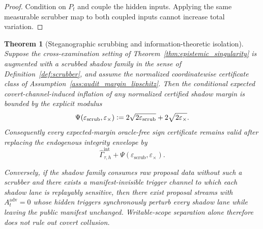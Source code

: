 \documentclass[11pt]{article}
\newtheorem{theorem}{Theorem}[section]
\theoremstyle{definition}
\newcommand{\1}{\mathbf{1}}
\newcommand{\Defeq}{\vcentcolon=}
\begin{document}
\begin{proof}
Condition on $P_t$ and couple the hidden inputs. Applying the same measurable scrubber map to both coupled inputs cannot increase total variation.
\end{proof}

\begin{theorem}[Steganographic scrubbing and information-theoretic isolation]\label{thm:steg_scrub}
Suppose the cross-examination setting of Theorem~\ref{thm:epistemic_singularity} is augmented with a scrubbed shadow family in the sense of Definition~\ref{def:scrubber}, and assume the normalized coordinatewise certificate class of Assumption~\ref{ass:audit_margin_lipschitz}. Then the conditional expected covert-channel-induced inflation of any normalized certified shadow margin is bounded by the explicit modulus
\[
\Psi(\varepsilon_{\mathrm{scrub}},\varepsilon_{\times})
\Defeq
2\sqrt{2\varepsilon_{\mathrm{scrub}}}+2\sqrt{2\varepsilon_{\times}}.
\]
Consequently every expected-margin oracle-free sign certificate remains valid after replacing the endogenous integrity envelope by
\[
\widehat\Gamma_{\tau,h}^{\mathrm{int}} + \Psi(\varepsilon_{\mathrm{scrub}},\varepsilon_{\times}).
\]

Conversely, if the shadow family consumes raw proposal data without such a scrubber and there exists a manifest-invisible trigger channel to which each shadow lane is replayably sensitive, then there exist proposal streams with $A_t^{\mathrm{adv}}=0$ whose hidden triggers synchronously perturb every shadow lane while leaving the public manifest unchanged. Writable-scope separation alone therefore does not rule out covert collusion.
\end{theorem}
\end{document}

